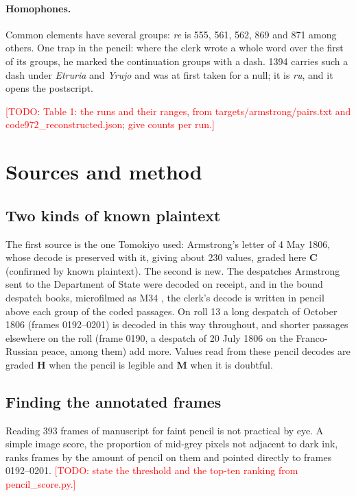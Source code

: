\documentclass[11pt]{article}
\newcommand{\todo}[1]{\textcolor{red}{[TODO: #1]}}
\newcommand{\grp}[1]{\textsf{#1}}
\begin{document}
\paragraph{Homophones.} Common elements have several groups: \emph{re} is \grp{555}, \grp{561}, \grp{562}, \grp{869} and \grp{871} among others. One trap in the pencil: where the clerk wrote a whole word over the first of its groups, he marked the continuation groups with a dash. \grp{1394} carries such a dash under \emph{Etruria} and \emph{Yrujo} and was at first taken for a null; it is \emph{ru}, and it opens the postscript.

\todo{Table 1: the runs and their ranges, from targets/armstrong/pairs.txt and code972\_reconstructed.json; give counts per run.}

\section{Sources and method}\label{sec:method}

\subsection{Two kinds of known plaintext}

The first source is the one Tomokiyo used: Armstrong's letter of 4 May 1806, whose decode is preserved with it, giving about 230 values, graded here \textbf{C} (confirmed by known plaintext). The second is new. The despatches Armstrong sent to the Department of State were decoded on receipt, and in the bound despatch books, microfilmed as M34 \cite{NARA:M34}, the clerk's decode is written in pencil above each group of the coded passages. On roll 13 a long despatch of October 1806 (frames 0192--0201) is decoded in this way throughout, and shorter passages elsewhere on the roll (frame 0190, a despatch of 20 July 1806 on the Franco-Russian peace, among them) add more. Values read from these pencil decodes are graded \textbf{H} when the pencil is legible and \textbf{M} when it is doubtful.

\subsection{Finding the annotated frames}

Reading 393 frames of manuscript for faint pencil is not practical by eye. A simple image score, the proportion of mid-grey pixels not adjacent to dark ink, ranks frames by the amount of pencil on them and pointed directly to frames 0192--0201. \todo{state the threshold and the top-ten ranking from pencil\_score.py.}
\end{document}
